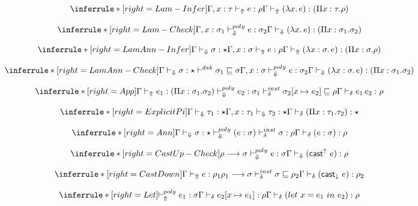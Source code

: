 \[
\inferrule*[right=Lam-Infer]
{\Gamma,x: \tau \infertypeno e : \rho} {\infertype (\lambda x.\, e) : (\Pi x: \tau. \rho)}
\]

\[
\inferrule*[right=Lam-Check]
{\Gamma,x: \sigma_1 \polycheck e : \sigma_2 } {\checktype (\lambda x.\, e) : (\Pi x: \sigma_1. \sigma_2)}
\]

\[
\inferrule*[right=LamAnn-Infer]
{
\checktype \sigma:\star \\
\Gamma,x: \sigma \infertypeno e : \rho } {\infertype (\lambda x:\sigma.\, e) : (\Pi x: \sigma. \rho)}
\]

\[
\inferrule*[right=LamAnn-Check]
{
\checktype \sigma:\star \\
\polymorphic \sigma_1 \sqsubseteq \sigma \\ \Gamma,x: \sigma \polycheck e : \sigma_2 } {\checktype (\lambda x:\sigma.\, e) : (\Pi x: \sigma_1. \sigma_2)}
\]

\[
\inferrule*[right=App]
{\infertype e_1 : (\Pi x:\sigma_1. \sigma_2) \\
\polycheck e_2 : \sigma_1 \\
\instinfercheck \sigma_2 [x \mapsto e_2] \sqsubseteq \rho}
{\infercheck e_1\,e_2 : \rho}
\]

\[
\inferrule*[right=ExplicitPi]
{\checktype \tau_1 : \star \\ \Gamma, x:\tau_1 \checktypeno \tau_2 : \star} {\infercheck (\Pi x:\tau_1. \tau_2) : \star}
\]

\[
\inferrule*[right=Ann]
{
\checktype \sigma : \star \\
\polycheck (e:\sigma) \\
\instinfercheck \sigma : \rho }
{\infercheck (e : \sigma) : \rho }
\]

\[
\inferrule*[right=CastUp-Check]
{ \rho \longrightarrow \sigma \\ \polycheck e : \sigma } {\checktype (\mathsf{cast}^\uparrow\ e) : \rho}
\]

\[
\inferrule*[right=CastDown]
{\infertype e : \rho_1 \\ \rho_1 \longrightarrow \sigma \\ \instinfercheck \sigma \sqsubseteq \rho_2} {\infercheck (\mathsf{cast}_\downarrow\ e) : \rho_2}
\]

\[
\inferrule*[right=Let]
{\polyinfer e_1 : \sigma \\
\infercheck e_2[x \mapsto e_1]: \rho}
{\infercheck ( let\ x = e_1\ in\ e_2 ) : \rho }
\]

\framebox{$ \infercheck \sigma : \star$ }

